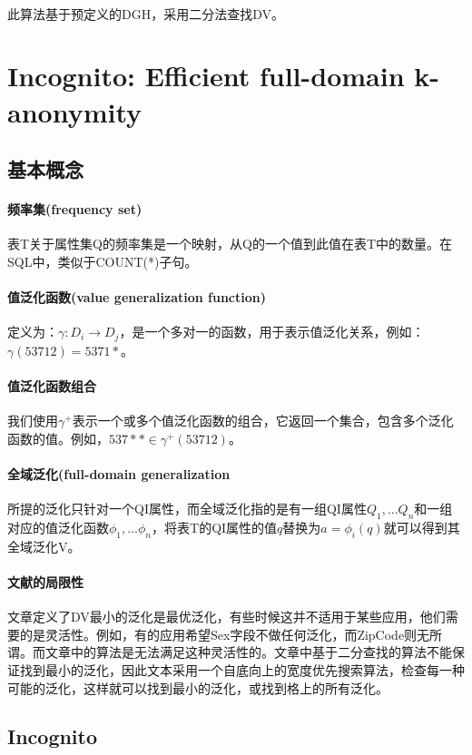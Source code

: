 \documentclass[12pt,a4paper]{article}
\begin{document}
\paragraph{} 此算法基于预定义的DGH，采用二分法查找DV。


\section{Incognito: Efficient full-domain k-anonymity\cite{incognito}}
\subsection{基本概念}
\paragraph{频率集(frequency set)} 表T关于属性集Q的频率集是一个映射，从Q的一个值到此值在表T中的数量。在SQL中，类似于COUNT(*)子句。
\paragraph{值泛化函数(value generalization function)} 定义为：$\gamma: D_i \rightarrow D_j$，是一个多对一的函数，用于表示值泛化关系，例如：$ \gamma(53712) = 5371*$。
\paragraph{值泛化函数组合} 我们使用$\gamma^+$表示一个或多个值泛化函数的组合，它返回一个集合，包含多个泛化函数的值。例如，$537** \in \gamma^+(53712)$。
\paragraph{全域泛化(full-domain generalization} \cite{samarati2001}所提的泛化只针对一个QI属性，而全域泛化指的是有一组QI属性$Q_1,...Q_n$和一组对应的值泛化函数$\phi_1,...\phi_n$，将表T的QI属性的值$q$替换为$a = \phi_i(q)$就可以得到其全域泛化V。
\paragraph{文献\cite{samarati2001}的局限性} 文章定义了DV最小的泛化是最优泛化，有些时候这并不适用于某些应用，他们需要的是灵活性。例如，有的应用希望Sex字段不做任何泛化，而ZipCode则无所谓。而文章中的算法是无法满足这种灵活性的。文章中基于二分查找的算法不能保证找到最小的泛化，因此文本采用一个自底向上的宽度优先搜索算法，检查每一种可能的泛化，这样就可以找到最小的泛化，或找到格上的所有泛化。

\subsection{Incognito}
\end{document}
